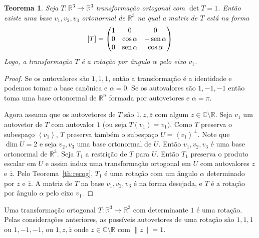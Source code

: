 \documentclass[12pt]{amsart}
\newcommand{\C}{\mathbb C}
\newcommand{\R}{\mathbb R}
\DeclareMathOperator{\sen}{\textrm{\rm sen}}
\newtheorem{theorem}{Teorema}
\theoremstyle{definition}
\begin{document}
\begin{theorem}
    Seja $T:\R^3\to\R^3$ transformação ortogonal com $\det T=1$. 
    Então existe uma base $v_1,v_2,v_3$ ortonormal de $\R^3$ na qual a matriz de $T$ está na forma 
    \[
        [T]=\begin{pmatrix} 1 & 0 & 0\\ 0 & \cos\alpha & -\sen\alpha \\ 0 & 
            \sen\alpha & \cos\alpha\end{pmatrix}
    \]
    Logo, a transformação $T$ é a rotação por ângulo $\alpha$ pelo eixo $v_1$.
\end{theorem}
\begin{proof}
    Se os autovalores são $1,1,1$, então a transformação é a identidade e podemos tomar a base canônica e $\alpha=0$. Se os autovalores são $1,-1,-1$ então toma uma base ortonormal de $\R^n$ formada por autovetores e $\alpha=\pi$. 

    Agora assuma que os autovetores de $T$ são $1,z,\bar z$ com algum $z\in\C\setminus\R$.  
    Seja $v_1$ um autovetor de $T$ com autovalor $1$ (ou seja $T(v_1)=v_1)$. Como $T$ preserva o subespaço 
    $\left<v_1\right>$, $T$ preserva também o subespaço $U=\left<v_1\right>^\perp$. Note que $\dim U=2$ e 
    seja $v_2,v_3$ uma base ortonormal
    de $U$. Então $v_1,v_2,v_3$ é uma base ortonormal de $\R^3$. 
    Seja $T_1$ a restrição de $T$ para $U$. Então $T_1$ preserva o produto escalar em 
    $U$ e assim induz uma transformação ortogonal em $U$ com autovalores $z$ e $\bar z$. Pelo 
    Teorema~\ref{th:recog}, $T_1$ é uma rotação com um ângulo $\alpha$ determinado por $z$ e $\bar z$. 
    A matriz de $T$ na base $v_1,v_2,v_3$ é na forma desejada, e $T$ é a rotação por ângulo $\alpha$ pelo eixo $v_1$.
\end{proof}


Uma transformação ortogonal $T:\R^3\to\R^3$ com determinante $1$ é uma rotação. Pelas 
considerações anteriores, as possíveis autovetores de uma rotação são $1,1,1$ ou  
$1,-1,-1$, ou $1,z,\bar z$ onde 
$z\in\C\setminus\R$ com $\|z\|=1$.
\end{document}
